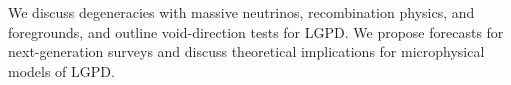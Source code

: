 
We discuss degeneracies with massive neutrinos, recombination physics, and foregrounds, and outline void-direction tests for LGPD. 
We propose forecasts for next-generation surveys and discuss theoretical implications for microphysical models of LGPD.
